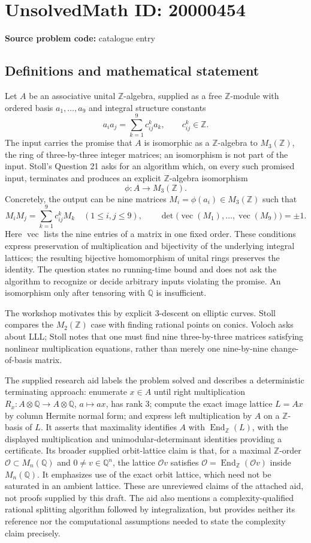 \documentclass[11pt]{article}
\newcommand{\Z}{\mathbb{Z}}
\newcommand{\Q}{\mathbb{Q}}
\begin{document}
\section*{UnsolvedMath ID: 20000454}
\textbf{Source problem code:} catalogue entry
\subsection{Definitions and mathematical statement}
Let \(A\) be an associative unital \(\Z\)-algebra, supplied as a free \(\Z\)-module with ordered basis \(a_1,\ldots,a_9\) and integral structure constants
\[
a_i a_j=\sum_{k=1}^9 c_{ij}^k a_k,\qquad c_{ij}^k\in\Z.
\]
The input carries the promise that \(A\) is isomorphic as a \(\Z\)-algebra to \(M_3(\Z)\), the ring of three-by-three integer matrices; an isomorphism is not part of the input. Stoll's Question 21 asks for an algorithm which, on every such promised input, terminates and produces an explicit \(\Z\)-algebra isomorphism
\[
\phi:A\longrightarrow M_3(\Z).
\]
Concretely, the output can be nine matrices \(M_i=\phi(a_i)\in M_3(\Z)\) such that
\[
M_iM_j=\sum_{k=1}^9 c_{ij}^k M_k\quad(1\leq i,j\leq9),\qquad
\det\bigl(\operatorname{vec}(M_1),\ldots,\operatorname{vec}(M_9)\bigr)=\pm1.
\]
Here \(\operatorname{vec}\) lists the nine entries of a matrix in one fixed order. These conditions express preservation of multiplication and bijectivity of the underlying integral lattices; the resulting bijective homomorphism of unital rings preserves the identity. The question states no running-time bound and does not ask the algorithm to recognize or decide arbitrary inputs violating the promise. An isomorphism only after tensoring with \(\Q\) is insufficient.

The workshop motivates this by explicit \(3\)-descent on elliptic curves. Stoll compares the \(M_2(\Z)\) case with finding rational points on conics. Voloch asks about LLL; Stoll notes that one must find nine three-by-three matrices satisfying nonlinear multiplication equations, rather than merely one nine-by-nine change-of-basis matrix.

The supplied research aid labels the problem solved and describes a deterministic terminating approach: enumerate \(x\in A\) until right multiplication \(R_x:A\otimes\Q\to A\otimes\Q\), \(a\mapsto ax\), has rank \(3\); compute the exact image lattice \(L=Ax\) by column Hermite normal form; and express left multiplication by \(A\) on a \(\Z\)-basis of \(L\). It asserts that maximality identifies \(A\) with \(\operatorname{End}_{\Z}(L)\), with the displayed multiplication and unimodular-determinant identities providing a certificate. Its broader supplied orbit-lattice claim is that, for a maximal \(\Z\)-order \(\mathcal O\subset M_n(\Q)\) and \(0\ne v\in\Q^n\), the lattice \(\mathcal O v\) satisfies
\(\mathcal O=\operatorname{End}_{\Z}(\mathcal O v)\) inside \(M_n(\Q)\). It emphasizes use of the exact orbit lattice, which need not be saturated in an ambient lattice. These are unreviewed claims of the attached aid, not proofs supplied by this draft. The aid also mentions a complexity-qualified rational splitting algorithm followed by integralization, but provides neither its reference nor the computational assumptions needed to state the complexity claim precisely.
\end{document}
